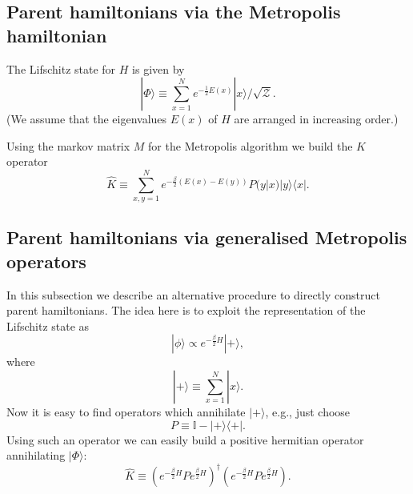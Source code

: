 \documentclass[twocolumn,lengthcheck,superscriptaddress]{revtex4-1}
\theoremstyle{definition}
\theoremstyle{remark}
\begin{document}
\subsection{Parent hamiltonians via the Metropolis hamiltonian}
The Lifschitz state for $H$ is given by
\begin{equation}
	|\Phi\rangle \equiv \sum_{x=1}^N e^{-\frac12E(x)}|x\rangle/\sqrt{\mathcal{Z}}.
\end{equation}
(We assume that the eigenvalues $E(x)$ of $H$ are arranged in increasing order.)

Using the markov matrix $M$ for the Metropolis algorithm we build the $K$ operator
\begin{equation}
	\widehat{K} \equiv \sum_{x,y=1}^N e^{-\frac{\beta}{2}(E(x)-E(y))} P(y|x) |y\rangle\langle x|.
\end{equation}


\subsection{Parent hamiltonians via generalised Metropolis operators}
In this subsection we describe an alternative procedure to directly construct parent hamiltonians. The idea here is to exploit the representation of the Lifschitz state as
\begin{equation}
	|\phi\rangle \propto e^{-\frac{\beta}{2} H}|+\rangle,
\end{equation}
where
\begin{equation}
	|+\rangle \equiv \sum_{x=1}^N |x\rangle.
\end{equation}
Now it is easy to find operators which annihilate $|+\rangle$, e.g., just choose
\begin{equation}
	P \equiv \mathbb{I} - |+\rangle\langle+|.
\end{equation}
Using such an operator we can easily build a positive hermitian operator annihilating $|\Phi\rangle$:
\begin{equation}
	\widehat{K} \equiv  \left(e^{-\frac{\beta}{2} H} P e^{\frac{\beta}{2} H} \right)^\dag\left(e^{-\frac{\beta}{2} H} P e^{\frac{\beta}{2} H} \right).
\end{equation}
\end{document}
